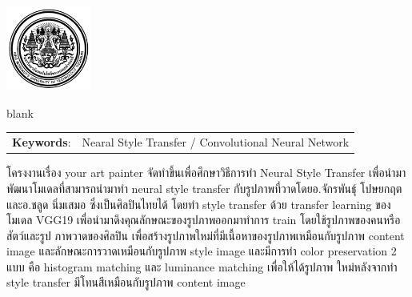\documentclass[12pt,oneside,openright,a4paper]{cpe-thai-project}
\begin{document}
\pdfstringdefDisableCommands{%
\let\MakeUppercase\relax
}

\begin{center}
\includegraphics[width=2.8cm]{logo02.jpg}
\end{center}
\vspace*{-1cm}

\maketitlepage
\makesignaturepage 

\abstract


blank

\begin{flushleft}
\begin{tabular*}{\textwidth}{@{}lp{}}
\textbf{Keywords}: & Nearal Style Transfer / Convolutional Neural Network
\end{tabular*}
\end{flushleft}
\endabstract

\thaiabstract
\par\setlength{\parindent}{5ex}
โครงงานเรื่อง your art painter จัดทำขึ้นเพื่อศึกษาวิธีการทำ Neural Style Transfer เพื่อนำมาพัฒนาโมเดลที่สามารถนำมาทำ neural style transfer กับรูปภาพที่วาดโดยอ.จักรพันธุ์ โปษยกฤต และอ.ชลูด นิ่มเสมอ ซึ่งเป็นศิลปินไทยได้ โดยทำ  style transfer ด้วย    transfer learning ของโมเดล VGG19 เพื่อนำมาดึงคุณลักษณะของรูปภาพออกมาทำการ train  โดยใช้รูปภาพของคนหรือสัตว์และรูป
\newline
ภาพวาดของศิลปิน เพื่อสร้างรูปภาพใหม่ที่มีเนื้อหาของรูปภาพเหมือนกับรูปภาพ content image และลักษณะการวาดเหมือนกับรูปภาพ style image และมีการทำ color preservation 2 แบบ คือ histogram matching และ luminance matching เพื่อให้ได้รูปภาพ
ใหม่หลังจากทำ style transfer มีโทนสีเหมือนกับรูปภาพ content image 

\end{document}
